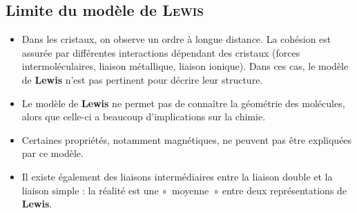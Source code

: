\documentclass[../main/main.tex]{subfiles}
\begin{document}
\subsection{Limite du modèle de \textsc{Lewis}}
\begin{itemize}
    \item Dans les cristaux, on observe un ordre à longue distance. La cohésion
        est assurée par différentes interactions dépendant des cristaux (forces
        intermoléculaires, liaison métallique, liaison ionique). Dans ces cas,
        le modèle de \textbf{Lewis} n'est pas pertinent pour décrire leur
        structure.
    \item Le modèle de \textbf{Lewis} ne permet pas de connaître la géométrie
        des molécules, alors que celle-ci a beaucoup d'implications sur la
        chimie.
    \item Certaines propriétés, notamment magnétiques, ne peuvent pas être
        expliquées par ce modèle.
    \item Il existe également des liaisons intermédiaires entre la liaison
        double et la liaison simple : la réalité est une «~moyenne~» entre deux
        représentations de \textbf{Lewis}.
\end{itemize}
\end{document}

